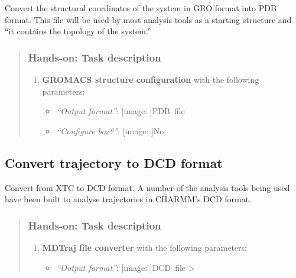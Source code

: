 \documentclass[twocolumn]{bmcart}%
\def\texttt{[image: ]}
\providecommand{\tightlist}{%
  \setlength{\itemsep}{0pt}\setlength{\parskip}{0pt}}
\begin{document}
Convert the structural coordinates of the system in GRO format into PDB
format. This file will be used by most analysis tools as a starting
structure and ``it contains the topology of the system.''

\begin{quote}
\hypertarget{hands-on-task-description-7}{%
\subsubsection{Hands-on: Task
description}\label{hands-on-task-description-7}}

\begin{enumerate}
\def\labelenumi{\arabic{enumi}.}
\tightlist
\item
  \textbf{GROMACS structure configuration} with the following
  parameters:

  \begin{itemize}
  \tightlist
  \item
    \emph{``Output format''}: \texttt{PDB\ file}
  \item
    \emph{``Configure box?''}: \texttt{No}
  \end{itemize}
\end{enumerate}


\end{quote}

\hypertarget{convert-trajectory-to-dcd-format}{%
\subsection{Convert trajectory to DCD
format}\label{convert-trajectory-to-dcd-format}}

Convert from XTC to DCD format. A number of the analysis tools being
used have been built to analyse trajectories in CHARMM's DCD format.

\begin{quote}
\hypertarget{hands-on-task-description-8}{%
\subsubsection{Hands-on: Task
description}\label{hands-on-task-description-8}}

\begin{enumerate}
\def\labelenumi{\arabic{enumi}.}
\tightlist
\item
  \textbf{MDTraj file converter} with the following parameters:

  \begin{itemize}
  \tightlist
  \item
    \emph{``Output format''}: \texttt{DCD\ file} \textgreater{}
  \end{itemize}
\end{enumerate}


\end{quote}
\end{document}
